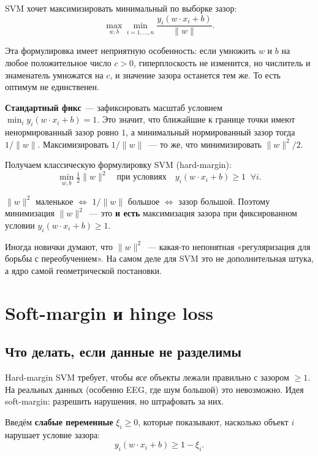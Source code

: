 \documentclass[12pt,a4paper]{article}
\begin{document}
SVM хочет максимизировать минимальный по выборке зазор:
\[
  \max_{w, b} \min_{i=1,\ldots,n} \frac{y_i (w \cdot x_i + b)}{\|w\|}.
\]

Эта формулировка имеет неприятную особенность: если умножить $w$ и $b$ на любое положительное число $c > 0$, гиперплоскость не изменится, но числитель и знаменатель умножатся на $c$, и значение зазора останется тем же. То есть оптимум не единственен.

\textbf{Стандартный фикс}~--- зафиксировать масштаб условием $\min_i y_i(w \cdot x_i + b) = 1$. Это значит, что ближайшие к границе точки имеют ненормированный зазор ровно $1$, а минимальный нормированный зазор тогда $1/\|w\|$. Максимизировать $1/\|w\|$~--- то же, что минимизировать $\|w\|^2 / 2$.

Получаем классическую формулировку SVM (hard-margin):
\[
  \min_{w, b} \tfrac{1}{2}\|w\|^2
  \quad \text{при условиях} \quad
  y_i (w \cdot x_i + b) \ge 1 \;\; \forall i.
\]

\begin{intuition}
$\|w\|^2$ маленькое $\Leftrightarrow$ $1/\|w\|$ большое $\Leftrightarrow$ зазор большой. Поэтому минимизация $\|w\|^2$~--- это \textbf{и есть} максимизация зазора при фиксированном условии $y_i(w \cdot x_i + b) \ge 1$.

Иногда новички думают, что $\|w\|^2$~--- какая-то непонятная «регуляризация для борьбы с переобучением». На самом деле для SVM это не дополнительная штука, а ядро самой геометрической постановки.
\end{intuition}

\section{Soft-margin и hinge loss}

\subsection{Что делать, если данные не разделимы}

Hard-margin SVM требует, чтобы \emph{все} объекты лежали правильно с зазором $\ge 1$. На реальных данных (особенно EEG, где шум большой) это невозможно. Идея soft-margin: разрешить нарушения, но штрафовать за них.

Введём \textbf{слабые переменные} $\xi_i \ge 0$, которые показывают, насколько объект $i$ нарушает условие зазора:
\[
  y_i (w \cdot x_i + b) \ge 1 - \xi_i.
\]
\end{document}
